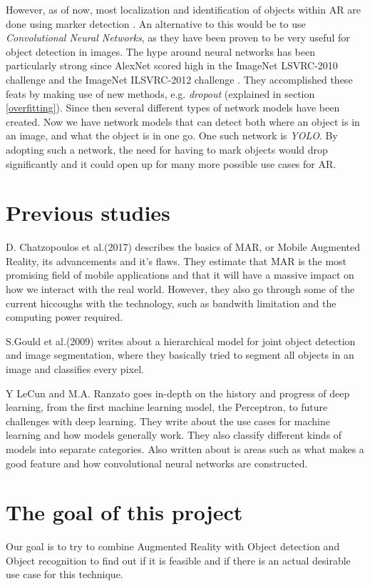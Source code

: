 However, as of now, most localization and identification of objects within AR are done using 
marker detection \cite{markerDetection}. An alternative to this would be to use 
\textit{Convolutional Neural Networks}, as they have been proven to be very useful for 
object detection in 
images. The hype around neural networks has been particularly strong since AlexNet scored 
high in the ImageNet LSVRC-2010 challenge and the ImageNet ILSVRC-2012 challenge 
\cite{NIPS2012_4824}. They accomplished these feats by making use of new methods, e.g. 
\textit{dropout} (explained in section \ref{overfitting}). Since then several different types of network models have been created. 
Now we have network models that can detect both where an object is in an image, and what 
the object is in one go. One such network is \textit{YOLO}\cite{YOLO1}. By adopting such a 
network, the need for having to mark objects would drop significantly and it could open up 
for many more possible use cases for AR.
 
\section{Previous studies}
\label{subsecPrevStud}
D. Chatzopoulos et al.(2017) describes the basics of MAR, or Mobile Augmented Reality, its advancements and it's flaws. They estimate that MAR is the most promising field of mobile applications and that it will have a massive impact on how we interact with the real world. However, they also go through some of the current hiccoughs with the technology, such as bandwith limitation and the computing power required. 
\cite{MARS}

S.Gould et al.(2009) writes about a hierarchical model for joint object detection and image segmentation, where they basically tried to segment all objects in an image and classifies every pixel. 
\cite{NIPS2009_3766}


Y LeCun and M.A. Ranzato goes in-depth on the history and progress of deep learning, from the first machine learning model, the Perceptron, to future challenges with deep learning. They write about the use cases for machine learning and how models generally work. They also classify different kinds of models into separate categories. Also written about is areas such as what makes a good feature and how convolutional neural networks are constructed.
\cite{deepLearningTutorial}


\section{The goal of this project}
\label{subsecGoal}
Our goal is to try to combine Augmented Reality with Object detection and Object recognition to find out if it is feasible and if there is an actual desirable use case for this technique. 

